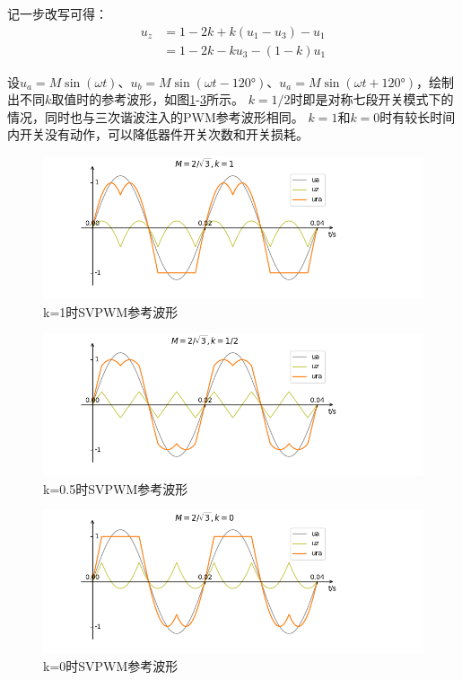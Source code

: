 \documentclass{ctexart}
\numberwithin{equation}{section}
\begin{document}
记一步改写可得：
\begin{equation}
\begin{aligned}
	u_z &= 1-2k + k(u_1-u_3)-u_1\\
	&=1-2k-ku_3-(1-k)u_1
\end{aligned}
\end{equation}

设$u_a = M\sin(\omega t)$、$u_b = M\sin(\omega t-\ang{120})$、$u_a = M\sin(\omega t + \ang{120})$，绘制出不同$ k $取值时的参考波形，如图\ref{fig:svpwm-wave-k1}-\ref{fig:svpwm-wave-k0}所示。
$ k=1/2 $时即是对称七段开关模式下的情况，同时也与三次谐波注入的PWM参考波形相同。
$ k=1 $和$ k=0 $时有较长时间内开关没有动作，可以降低器件开关次数和开关损耗。

\begin{figure}[htb]
  \centering
  \includegraphics[width = .8\linewidth ]{svpwm_modulation_wave_k1.png}
  \caption{k=1时SVPWM参考波形}
  \label{fig:svpwm-wave-k1}
\end{figure}
\begin{figure}[htb]
  \centering
  \includegraphics[width = .8\linewidth ]{svpwm_modulation_wave_k05.png}
  \caption{k=0.5时SVPWM参考波形}
  \label{fig:svpwm-wave-k05}
\end{figure}

\begin{figure}[htb]
  \centering
  \includegraphics[width = .8\linewidth ]{svpwm_modulation_wave_k0.png}
  \caption{k=0时SVPWM参考波形}
  \label{fig:svpwm-wave-k0}
\end{figure}
\end{document}
